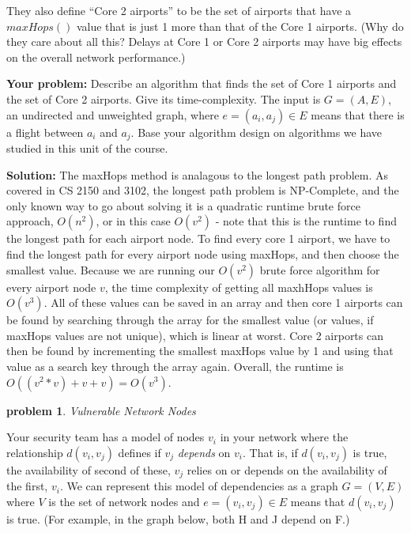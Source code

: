 \documentclass[10pt]{article}
\newcommand{\solution}[1]{\color{blue}\hfill\break\noindent\textbf{Solution:} #1\color{black}}
\newtheorem{problem}{\sc\color{cit}problem}
\begin{document}
They also define ``Core 2 airports'' to be the set of airports that have a $maxHops()$ value that is just 1 more than that of the Core 1 airports.  (Why do they care about all this?  Delays at Core 1 or Core 2 airports may have big effects on the overall network performance.)

\textbf{Your problem: } Describe an algorithm that finds the set of Core 1 airports and the set of Core 2 airports.  Give its time-complexity.   The input is $G=(A,E)$, an undirected and unweighted graph, where $e = (a_i, a_j) \in E$ means that there is a flight between $a_i$ and $a_j$. Base your algorithm design on algorithms we have studied in this unit of the course.

\solution{
The maxHops method is analagous to the longest path problem. As covered in CS 2150 and 3102, the longest path problem is NP-Complete, and the only known way to go about solving it is a quadratic runtime brute force approach, $O(n^2)$, or in this case $O(v^2)$ - note that this is the runtime to find the longest path for each airport node. To find every core 1 airport, we have to find the longest path for every airport node using maxHops, and then choose the smallest value. Because we are running our $O(v^2)$ brute force algorithm for every airport node $v$, the time complexity of getting all maxhHops values is $O(v^3)$. All of these values can be saved in an array and then core 1 airports can be found by searching through the array for the smallest value (or values, if maxHops values are not unique), which is linear at worst. Core 2 airports can then be found by incrementing the smallest maxHops value by 1 and using that value as a search key through the array again. Overall, the runtime is $O((v^2 * v) + v + v) = O(v^3)$.
}



\begin{problem}Vulnerable Network Nodes\end{problem}

Your security team has a model of nodes $v_i$ in your network where the relationship $d(v_i, v_j)$ defines if $v_j$ \emph{depends} on $v_i$. That is, if $d(v_i, v_j)$ is true,  the availability of second of these, $v_j$ relies on or depends on the availability of the first, $v_i$. We can represent this model of dependencies as a graph $G=(V,E)$ where $V$ is the set of network nodes and $e=(v_i, v_j) \in E$ means that $d(v_i, v_j)$ is true.  (For example, in the graph below, both H and J depend on F.)
\end{document}
